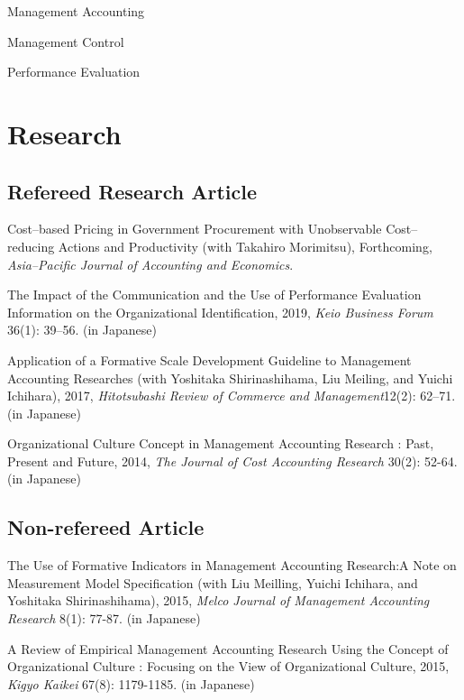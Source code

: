 \documentclass[letterpaper,uplatex]{article}
\renewenvironment{itemize}{
  \begin{list}{}{
    \setlength{\leftmargin}{1.5em}
  }
}{
  \end{list}
}
\begin{document}
\begin{itemize}
  \item Management Accounting
  \item Management Control
  \item Performance Evaluation
\end{itemize}

\section*{Research}

\subsection*{Refereed Research Article}

\begin{itemize}
    \item Cost--based Pricing in Government Procurement with Unobservable Cost--reducing Actions and Productivity (with Takahiro Morimitsu), Forthcoming, \textit{Asia--Pacific Journal of Accounting and Economics}.
    
    \item The Impact of the Communication and the Use of Performance Evaluation Information on the Organizational Identification, 2019, \textit{Keio Business Forum} 36(1): 39--56. (in Japanese)

	\item Application of a Formative Scale Development Guideline to Management Accounting Researches (with Yoshitaka Shirinashihama, Liu Meiling, and Yuichi Ichihara), 2017, \textit{Hitotsubashi Review of Commerce and Management}12(2): 62--71. (in Japanese)

	\item Organizational Culture Concept in Management Accounting Research : Past, Present and Future, 2014, \textit{The Journal of Cost Accounting Research} 30(2): 52-64. (in Japanese)
\end{itemize}

\subsection*{Non-refereed Article}

\begin{itemize}
	\item The Use of Formative Indicators in Management Accounting Research:A Note on Measurement Model Specification (with Liu Meilling, Yuichi Ichihara, and Yoshitaka Shirinashihama), 2015, \textit{Melco Journal of Management Accounting Research} 8(1): 77-87. (in Japanese)

	\item A Review of Empirical Management Accounting Research Using the Concept of Organizational Culture : Focusing on the View of Organizational Culture, 2015, \textit{Kigyo Kaikei} 67(8): 1179-1185. (in Japanese)
\end{itemize}
\end{document}
